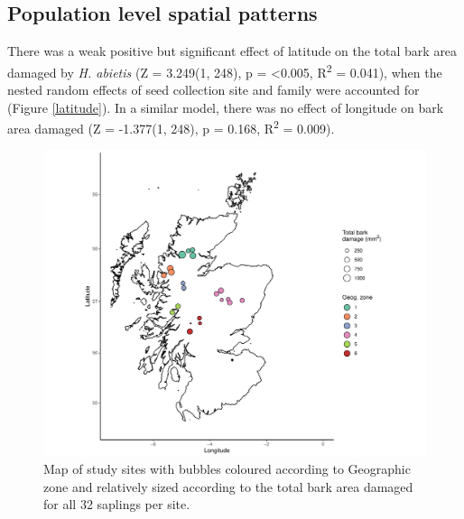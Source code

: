 \documentclass[a4paper, 11pt]{article}
\begin{document}


\subsection*{Population level spatial patterns}

There was a weak positive but significant effect of latitude on the total bark area damaged by \textit{H. abietis} (Z = 3.249(1, 248), p =  \textless{}0.005, R\textsuperscript{2} = 0.041), when the nested random effects of seed collection site and family were accounted for (Figure \ref{latitude}). In a similar model, there was no effect of longitude on bark area damaged (Z = -1.377(1, 248), p = 0.168, R\textsuperscript{2} = 0.009).  

\begin{figure}
	\includegraphics[width=\textwidth]{bubble_map}	
	\caption{Map of study sites with bubbles coloured according to Geographic zone and relatively sized according to the total bark area damaged for all 32 saplings per site.}
\end{figure}
\end{document}
